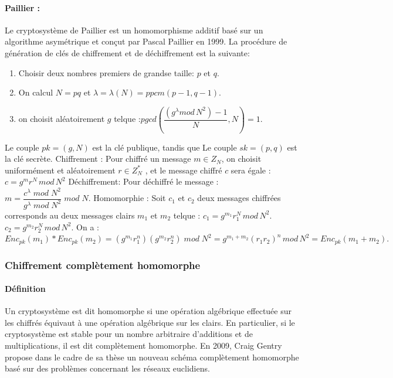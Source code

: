 \documentclass[a4paper,12pt]{article}
\begin{document}
\paragraph{Paillier : }
Le cryptosystème de Paillier est un homomorphisme additif basé sur un algorithme asymétrique et conçut par Pascal Paillier en 1999.\newline
La procédure de génération de clés de chiffrement et de déchiffrement est la suivante:
\begin{enumerate}
\item Choisir deux nombres premiers de grandse taille: $p$   et $q$.
\item  On calcul $N=pq$ \newline et $\lambda =\lambda(N) = ppcm(p-1, q-1)$.
\item  on choisit aléatoirement $g$ telque :\newline $pgcd(\dfrac{(g^\lambda mod\, N^2)-1 }{N}, N) = 1$.\newline
\end{enumerate}
Le couple $pk = (g, N)$ est la clé publique, tandis que Le couple $sk = (p,q)$ est la clé secrète.\newline
Chiffrement :\newline
Pour chiffré un message $m \in Z_N$, on choisit uniformément et aléatoirement $r\in Z^{*}_N$ ,\newline
et le message chiffré $c$ sera égale : $c = g^mr^N\,mod\,N^2$\newline
Déchiffrement:\newline
Pour déchiffré le message : $m = \dfrac{c^\lambda\;mod\;N^2}{g^\lambda\;mod\;N^2}\;mod\;N.$\newline
Homomorphie :\newline
Soit $c_1$ et $c_2$ deux messages chiffrées corresponds au deux messages clairs $m_1$ et $m_2$ telque :\newline
$c_1 = g^{m_1}r_1^N\,mod\,N^2.$\newline
$c_2 = g^{m_2}r_2^N\,mod\,N^2.$\newline
On a :\newline
\newline
$Enc_{pk}(m_1) * Enc_{pk}(m_2) = (g^{m_1}r_1^n)(g^{m_2}r_2^n)\;mod\;N^2 = g^{m_1 + m_2}(r_1r_2)^n\,mod\,N^2 = Enc_{pk}(m_1 + m_2).$\newline
\subsubsection{Chiffrement complètement homomorphe}
          \paragraph{Définition }
Un cryptosystème est dit homomorphe si une opération algébrique effectuée sur les chiffrés équivaut à une opération algébrique sur les clairs. En particulier, si le cryptosystème est stable pour un nombre arbitraire d'additions et de multiplications, il est dit complètement homomorphe.\newline
En 2009, Craig Gentry propose dans le cadre de sa thèse un nouveau schéma complètement homomorphe basé sur des problèmes concernant les réseaux euclidiens.
\end{document}
